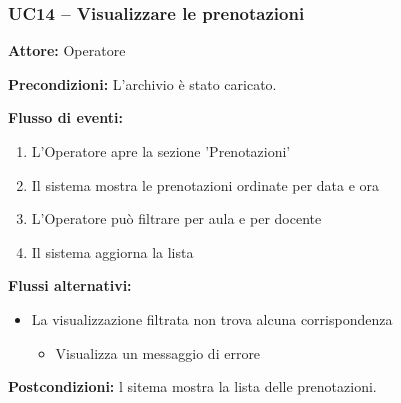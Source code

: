 \documentclass[a4paper,11pt]{article}
\begin{document}
\begin{samepage}
\subsubsection*{UC14 -- Visualizzare le prenotazioni}
\begin{ucbox}

\noindent\textbf{Attore:} Operatore\par
\noindent\textbf{Precondizioni:} L'archivio è stato caricato.\par

\noindent\textbf{Flusso di eventi:}
\begin{enumerate}
\item L'Operatore apre la sezione 'Prenotazioni' \item Il sistema mostra le prenotazioni ordinate per data e ora \item L'Operatore può filtrare per aula e per docente \item Il sistema aggiorna la lista \end{enumerate}
\noindent\textbf{Flussi alternativi:}
\begin{itemize}
\item[3a.] La visualizzazione filtrata non trova alcuna corrispondenza
\begin{itemize}
\item Visualizza un messaggio di errore
\end{itemize}
\end{itemize}
\noindent\textbf{Postcondizioni:} l sitema mostra la lista delle prenotazioni.\par
\end{ucbox}
\end{samepage}
\end{document}
